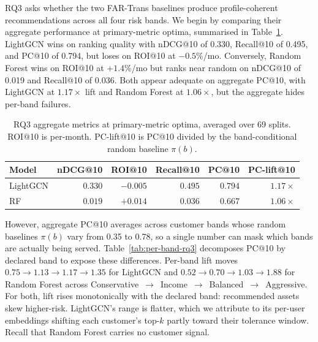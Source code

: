 RQ3 asks whether the two FAR-Trans baselines produce profile-coherent recommendations across all four risk bands. We begin by comparing their aggregate performance at primary-metric optima, summarised in Table~\ref{tab:rq3-aggregate}. LightGCN wins on ranking quality with nDCG@10 of 0.330, Recall@10 of 0.495, and PC@10 of 0.794, but loses on ROI@10 at $-0.5$\%/mo. Conversely, Random Forest wins on ROI@10 at $+1.4$\%/mo but ranks near random on nDCG@10 of 0.019 and Recall@10 of 0.036. Both appear adequate on aggregate PC@10, with LightGCN at $1.17\times$ lift and Random Forest at $1.06\times$, but the aggregate hides per-band failures.

\begin{table}[!t]
\centering
\small
\begin{tabular}{lrrrrr}
\toprule
Model & nDCG@10 & ROI@10 & Recall@10 & PC@10 & PC-lift@10 \\
\midrule
LightGCN      & $0.330$ & $-0.005$ & $0.495$ & $0.794$ & $1.17\times$ \\
RF            & $0.019$ & $+0.014$ & $0.036$ & $0.667$ & $1.06\times$ \\
\bottomrule
\end{tabular}
\caption{RQ3 aggregate metrics at primary-metric optima, averaged over 69 splits. ROI@10 is per-month. PC-lift@10 is PC@10 divided by the band-conditional random baseline $\pi(b)$.}
\label{tab:rq3-aggregate}
\end{table}

However, aggregate PC@10 averages across customer bands whose random baselines $\pi(b)$ vary from 0.35 to 0.78, so a single number can mask which bands are actually being served. Table~\ref{tab:per-band-rq3} decomposes PC@10 by declared band to expose these differences. Per-band lift moves $0.75 \to 1.13 \to 1.17 \to 1.35$ for LightGCN and $0.52 \to 0.70 \to 1.03 \to 1.88$ for Random Forest across Conservative~$\to$~Income~$\to$~Balanced~$\to$~Aggressive. For both, lift rises monotonically with the declared band: recommended assets skew higher-risk. LightGCN's range is flatter, which we attribute to its per-user embeddings shifting each customer's top-$k$ partly toward their tolerance window. Recall that Random Forest carries no customer signal.

